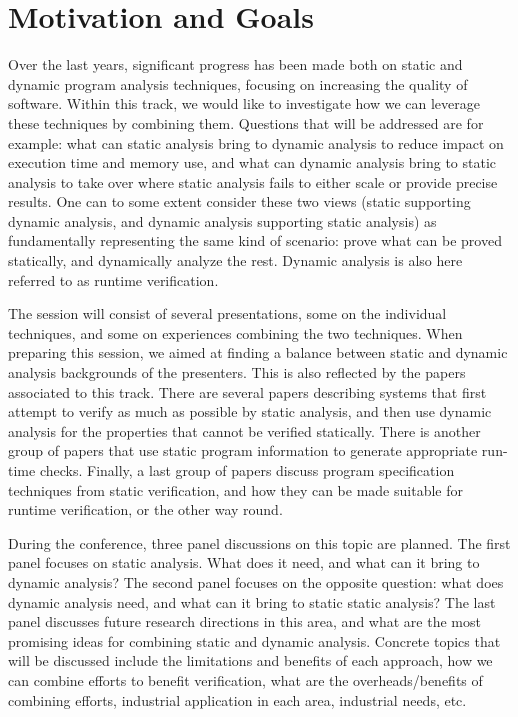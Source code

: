 
\section{Motivation and Goals}

Over the last years, significant progress has been made both on static and dynamic program analysis techniques, focusing on increasing the quality of software. Within this track, we would like to investigate how we can leverage these techniques by combining them. Questions that will be addressed are for example: what can static analysis  bring to dynamic analysis to reduce
impact on execution time and memory use, and what can dynamic
analysis bring to static analysis to take over where
static analysis fails to either scale or provide precise results.
One can to some extent consider these two views (static supporting dynamic analysis, and dynamic analysis supporting static analysis)
as fundamentally representing the same kind of scenario: prove what can be proved statically, and dynamically analyze the rest. Dynamic analysis is also here referred to as runtime verification.

The session will consist of several presentations, some on the individual techniques, and some on experiences combining the two techniques. When preparing this session, we aimed at finding a balance between static and dynamic analysis backgrounds of the presenters. This is also reflected by the papers associated to this track. There are several papers describing systems that first attempt to verify as much as possible by static analysis, and then use dynamic analysis for the properties that cannot be verified statically. There is another group of papers that use static program information to generate appropriate run-time checks. Finally, a last group of papers discuss program specification techniques from static verification, and how they can be made suitable for runtime verification, or the other way round.

During the conference, three panel discussions on this topic are planned. The first panel focuses on static analysis. What does it need, and what can it bring to dynamic analysis? The second panel focuses on the opposite question: what does dynamic analysis need, and what can it bring to static static analysis? The last panel  discusses future research directions in this area, and what are the most promising ideas for combining static and dynamic analysis. Concrete topics that will be discussed include the limitations and benefits of each approach, how we can combine efforts to benefit verification, what are the overheads/benefits of combining efforts, industrial application in each area, industrial needs, etc.



